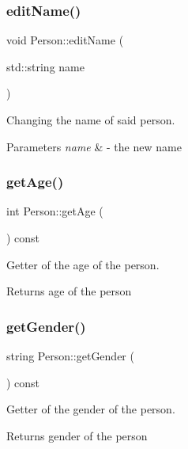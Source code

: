 \subsubsection{\texorpdfstring{edit\+Name()}{editName()}}
{\footnotesize\ttfamily void Person\+::edit\+Name (\begin{DoxyParamCaption}\item[{std\+::string}]{name }\end{DoxyParamCaption})}



Changing the name of said person. 


\begin{DoxyParams}{Parameters}
{\em name} & -\/ the new name \\
\hline
\end{DoxyParams}
\mbox{\label{class_person_a4b66dbee570398920b8fb6aacddd2559}} 
\subsubsection{\texorpdfstring{get\+Age()}{getAge()}}
{\footnotesize\ttfamily int Person\+::get\+Age (\begin{DoxyParamCaption}{ }\end{DoxyParamCaption}) const}



Getter of the age of the person. 

\begin{DoxyReturn}{Returns}
age of the person 
\end{DoxyReturn}
\mbox{\label{class_person_a3abba7ffeabffb247ec36230df68cec4}} 
\subsubsection{\texorpdfstring{get\+Gender()}{getGender()}}
{\footnotesize\ttfamily string Person\+::get\+Gender (\begin{DoxyParamCaption}{ }\end{DoxyParamCaption}) const}



Getter of the gender of the person. 

\begin{DoxyReturn}{Returns}
gender of the person 
\end{DoxyReturn}
\mbox{\label{class_person_a9db2e2ccfc6cfa0d7979613ec2aaa922}} 
